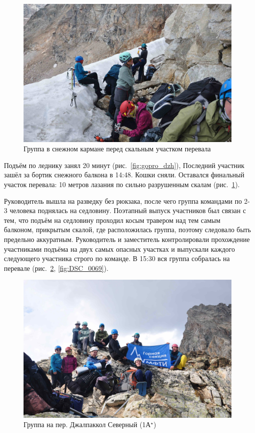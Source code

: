 \begin{figure}[h!]	
	\centering
	\includegraphics[angle=0, width=0.7\linewidth]{../pics/DSC_0021}
	\caption{Группа в снежном кармане перед скальным участком перевала}
	\label{fig:DSC_0021}
\end{figure}

Подъём по леднику занял 20 минут (рис.~\ref{fig:gopro_dzh}), Последний участник зашёл за бортик снежного балкона в 14:48. Кошки сняли. Оставался финальный участок перевала: 10 метров лазания по сильно разрушенным скалам (рис.~\ref{fig:DSC_0021}).

Руководитель вышла на разведку без рюкзака, после чего группа командами по 2-3 человека поднялась на седловину. Поэтапный выпуск участников был связан с тем, что подъём на седловину проходил косым травером над тем самым балконом, прикрытым скалой, где расположилась группа, поэтому следовало быть предельно аккуратным. Руководитель и заместитель контролировали прохождение участниками подъёма на двух самых опасных участках и выпускали каждого следующего участника строго по команде. В 15:30 вся группа собралась на перевале (рис.~\ref{fig:DSC_0063}, \ref{fig:DSC_0069}).

\begin{figure}[h!]	
	\centering
	\includegraphics[angle=0, width=0.7\linewidth]{../pics/DSC_0063}
	\caption{Группа на пер. Джалпаккол Северный (1А$^\star$)}
	\label{fig:DSC_0063}
\end{figure}


